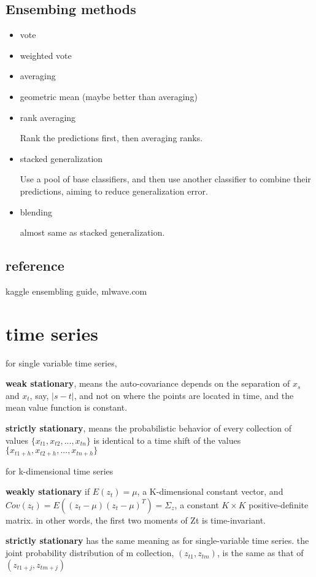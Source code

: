 \documentclass[10pt,a4paper]{book}
\begin{document}
\subsection{Ensembing methods}
\begin{itemize}
	\item vote
	\item weighted vote
	\item averaging
	\item geometric mean (maybe better than averaging)
	\item rank averaging
	
	 Rank the predictions first, then averaging ranks. 
	\item stacked generalization
	
	 Use a pool of base classifiers, and then use another classifier to combine their predictions, aiming to reduce generalization error.
	\item blending
	
	almost same as stacked generalization. 
	
\end{itemize}
\subsection{reference}
	kaggle ensembling guide, mlwave.com

	
\section {time series}

for single variable time series,

\textbf{weak stationary}, means the auto-covariance depends on the separation of $x_s$ and $x_t$, say, $\vert s-t \vert$, and not on where the points are located in time, and the mean value function is constant.

\textbf{strictly stationary}, means the probabilistic behavior of every collection of values $\{x_{t1}, x_{t2}, ..., x_{tn}\}$ is identical to a time shift of the values $\{x_{t1+h}, x_{t2+h}, ..., x_{tn+h}\}$

for k-dimensional time series

\textbf{weakly stationary} if $E(z_t) = \mu$, a K-dimensional constant vector, and $Cov(z_t) = E((z_t-\mu)(z_t-\mu)^T) = \Sigma_z$, a constant $K \times K$ positive-definite matrix. in other words, the first two moments of Zt is time-invariant.

\textbf{strictly stationary} has the same meaning as for single-variable time series. the joint probability distribution of m collection, $(z_{t1}, z_{tm})$, is the same as that of $(z_{t1+j}, z_{tm+j})$
\end{document}
